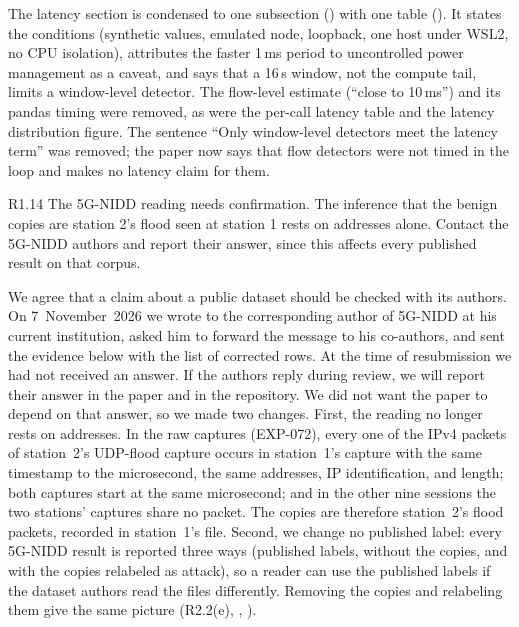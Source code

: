 \action The latency section is condensed to one subsection () with one table (). It states the conditions (synthetic values, emulated node, loopback, one host under WSL2, no CPU isolation), attributes the faster 1\,ms period to uncontrolled power management as a caveat, and says that a 16\,s window, not the compute tail, limits a window-level detector. The flow-level estimate (``close to 10\,ms'') and its pandas timing were removed, as were the per-call latency table and the latency distribution figure. The sentence ``Only window-level detectors meet the latency term'' was removed; the paper now says that flow detectors were not timed in the loop and makes no latency claim for them.

\label{rv:R1.14}
\begin{concern}{R1.14}
The 5G-NIDD reading needs confirmation. The inference that the benign copies are station 2's flood seen at station 1 rests on addresses alone. Contact the 5G-NIDD authors and report their answer, since this affects every published result on that corpus.
\end{concern}
\response We agree that a claim about a public dataset should be checked with its authors. On 7~November~2026 we wrote to the corresponding author of 5G-NIDD at his current institution, asked him to forward the message to his co-authors, and sent the evidence below with the list of corrected rows. At the time of resubmission we had not received an answer. If the authors reply during review, we will report their answer in the paper and in the repository. We did not want the paper to depend on that answer, so we made two changes. First, the reading no longer rests on addresses. In the raw captures (EXP-072), every one of the \RPcapBSTwoPkts{} IPv4 packets of station~2's UDP-flood capture occurs in station~1's capture with the same timestamp to the microsecond, the same addresses, IP identification, and length; both captures start at the same microsecond; and in the other nine sessions the two stations' captures share no packet. The copies are therefore station~2's flood packets, recorded in station~1's file. Second, we change no published label: every 5G-NIDD result is reported three ways (published labels, without the copies, and with the copies relabeled as attack), so a reader can use the published labels if the dataset authors read the files differently. Removing the copies and relabeling them give the same picture (R2.2(e), , ).

